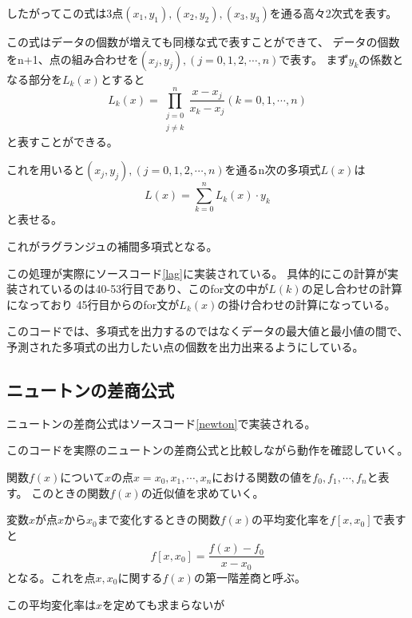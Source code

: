 \documentclass[a4paper,11pt,dvipdfmx]{jsarticle}
\begin{document}
したがってこの式は3点$(x_1,y_1),(x_2,y_2),(x_3,y_3)$を通る高々2次式を表す。

この式はデータの個数が増えても同様な式で表すことができて、
データの個数をn+1、点の組み合わせを$(x_j,y_j),(j=0,1,2,\cdots,n)$で表す。
まず$y_k$の係数となる部分を$L_k(x)$とすると
\begin{equation*}
    L_k(x) = \prod_{\substack{j=0 \\ j \neq k}}^{n} \frac{x-x_j}{x_k-x_j} (k=0,1,\cdots,n)
\end{equation*}
と表すことができる。

これを用いると$(x_j,y_j),(j=0,1,2,\cdots,n)$を通るn次の多項式$L(x)$は
\begin{equation*}
    L(x) = \sum_{k=0}^{n} L_k(x) \cdot y_k
\end{equation*}
と表せる。

これがラグランジュの補間多項式となる。

この処理が実際にソースコード\ref{lag}に実装されている。
具体的にこの計算が実装されているのは40-53行目であり、このfor文の中が$L(k)$の足し合わせの計算になっており
45行目からのfor文が$L_k(x)$の掛け合わせの計算になっている。

このコードでは、多項式を出力するのではなくデータの最大値と最小値の間で、
予測された多項式の出力したい点の個数を出力出来るようにしている。

\subsection{ニュートンの差商公式}
ニュートンの差商公式はソースコード\ref{newton}で実装される。


このコードを実際のニュートンの差商公式と比較しながら動作を確認していく。

関数$f(x)$について$x$の点$x=x_0,x_1,\cdots,x_n$における関数の値を$f_0,f_1,\cdots,f_n$と表す。
このときの関数$f(x)$の近似値を求めていく。

変数$x$が点$x$から$x_0$まで変化するときの関数$f(x)$の平均変化率を$f[x,x_0]$で表すと
\begin{equation*}
    f[x,x_0] = \frac{f(x) - f_0}{x - x_0}
\end{equation*}
となる。これを点$x,x_0$に関する$f(x)$の第一階差商と呼ぶ。

この平均変化率は$x$を定めても求まらないが
\end{document}
